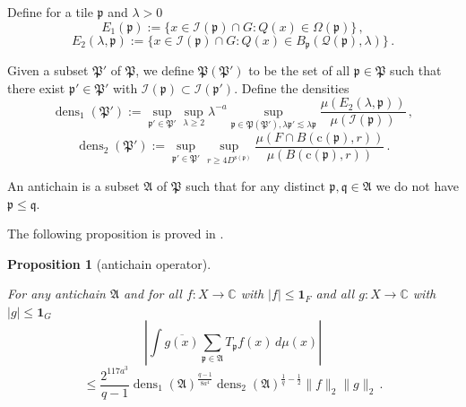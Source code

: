 \documentclass[10pt,a4paper]{article}
\theoremstyle{plain}
\newtheorem{proposition}[theorem]{Proposition}
\theoremstyle{definition}
\numberwithin{equation}{subsection}
\DeclareMathOperator{\dens}{\operatorname{dens}}
\newcommand{\fp}{{\mathfrak p}}
\newcommand{\fP}{{\mathfrak P}}
\newcommand{\fq}{{\mathfrak q}}
\newcommand{\pc}{{\mathrm{c}}}
\newcommand{\ps}{{\mathrm{s}}}
\newcommand{\fc}{{\Omega}}
\newcommand{\scI}{{\mathcal{I}}} %
\newcommand{\tQ}{{Q}}
\newcommand{\fcc}{{\mathcal{Q}}}
\newcommand{\lean}[1]{}
\newcommand{\uses}[1]{}
\newcommand{\leanok}{}
\def\C{\mathbb{C}}
\begin{document}
Define for a tile $\fp$ and $\lambda>0$
\begin{equation}\label{definee1}
    E_1(\fp):=\{x\in \scI(\fp)\cap G: \tQ(x)\in \fc(\fp)\}\, ,
\end{equation}
\begin{equation}\label{definee2}
    E_2(\lambda, \fp):=\{x\in \scI(\fp)\cap G: \tQ(x)\in B_{\fp}(\fcc(\fp), \lambda)\}\, .
\end{equation}



Given a subset $\fP'$ of $\fP$, we define
$\fP(\fP')$ to be the set of
all $\fp \in \fP$ such that there exist $\fp' \in \fP'$ with $\scI(\fp)\subset \scI(\fp')$. Define the densities
\begin{equation}\label{definedens1}
    {\dens}_1(\fP') := \sup_{\fp'\in \fP'}\sup_{\lambda \geq 2} \lambda^{-a} \sup_{\fp \in \fP(\fP'), \lambda \fp' \lesssim \lambda \fp}
    \frac{\mu({E}_2(\lambda, \fp))}{\mu(\scI(\fp))}\, ,
\end{equation}
\begin{equation}\label{definedens2}
    {\dens}_2(\fP') := \sup_{\fp'\in \fP'}
    \sup_{r\ge 4D^{\ps(\fp)}}
    \frac{\mu(F\cap B(\pc(\fp),r))}{\mu(B(\pc(\fp),r))}\, .
\end{equation}





An antichain is a subset $\mathfrak{A}$
of $\fP$ such that for any distinct $\fp,\fq\in \mathfrak{A}$ we do not have $\fp\le \fq$.

The following proposition is proved in .

\begin{proposition}[antichain operator]
\label{antichain-operator}
\leanok
\lean{antichain_operator}

\uses{dens2-antichain,dens1-antichain}
For any antichain $\mathfrak{A} $ and for all $f:X\to \C$ with $|f|\le \mathbf{1}_F$ and all $g:X\to\C$ with $|g| \le \mathbf{1}_G$
\begin{equation} \label{eq-antiprop}
    |\int \overline{g(x)} \sum_{\fp \in \mathfrak{A}} T_{\fp} f(x)\, d\mu(x)|
\end{equation}
\begin{equation}
    \le \frac{2^{117a^3}}{q-1} \dens_1(\mathfrak{A})^{\frac {q-1}{8a^4}}\dens_2(\mathfrak{A})^{\frac 1{q}-\frac 12} \|f\|_2 \|g\|_2\, .
\end{equation}
\end{proposition}
\end{document}
